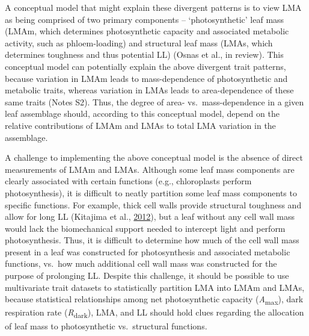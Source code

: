 \documentclass[12pt,]{article}
\theoremstyle{definition}
\theoremstyle{definition}
\theoremstyle{definition}
\theoremstyle{remark}
\begin{document}
A conceptual model that might explain these divergent patterns is to
view LMA as being comprised of two primary components --
`photosynthetic' leaf mass (LMAm, which determines photosynthetic
capacity and associated metabolic activity, such as phloem-loading) and
structural leaf mass (LMAs, which determines toughness and thus
potential LL) (Osnas et al., in review). This conceptual model can
potentially explain the above divergent trait patterns, because
variation in LMAm leads to mass-dependence of photosynthetic and
metabolic traits, whereas variation in LMAs leads to area-dependence of
these same traits (Notes S2). Thus, the degree of area-
vs.~mass-dependence in a given leaf assemblage should, according to this
conceptual model, depend on the relative contributions of LMAm and LMAs
to total LMA variation in the assemblage.

A challenge to implementing the above conceptual model is the absence of
direct measurements of LMAm and LMAs. Although some leaf mass components
are clearly associated with certain functions (e.g., chloroplasts
perform photosynthesis), it is difficult to neatly partition some leaf
mass components to specific functions. For example, thick cell walls
provide structural toughness and allow for long LL (Kitajima et al.,
\protect\hyperlink{ref-Kitajima2012}{2012}), but a leaf without any cell
wall mass would lack the biomechanical support needed to intercept light
and perform photosynthesis. Thus, it is difficult to determine how much
of the cell wall mass present in a leaf was constructed for
photosynthesis and associated metabolic functions, vs.~how much
additional cell wall mass was constructed for the purpose of prolonging
LL. Despite this challenge, it should be possible to use multivariate
trait datasets to statistically partition LMA into LMAm and LMAs,
because statistical relationships among net photosynthetic capacity
(\emph{A}\textsubscript{max}), dark respiration rate
(\emph{R}\textsubscript{dark}), LMA, and LL should hold clues regarding
the allocation of leaf mass to photosynthetic vs.~structural functions.
\end{document}
